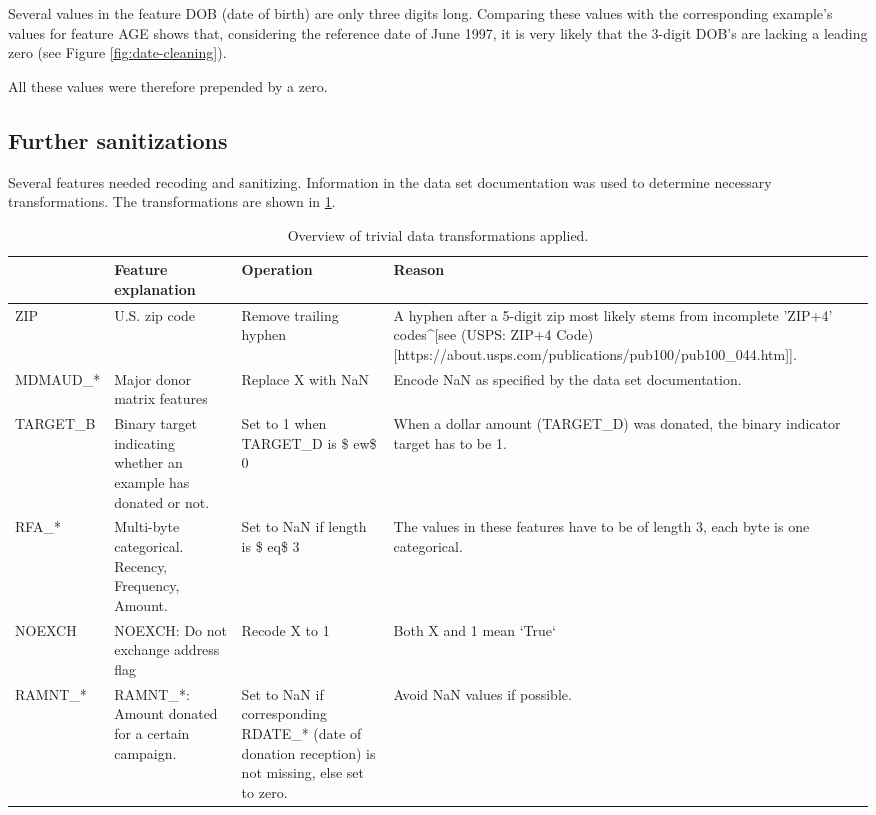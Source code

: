 \documentclass[
  11pt,
  a4paper,
  DIV=12,captions=tableheading,oneside]{scrbook}
\begin{document}
Several values in the feature DOB (date of birth) are only three digits long. Comparing these values with the corresponding example's values for feature AGE shows that, considering the reference date of June 1997, it is very likely that the 3-digit DOB's are lacking a leading zero (see Figure \ref{fig:date-cleaning}).

All these values were therefore prepended by a zero.

\hypertarget{further-sanitizations}{%
\subsection{Further sanitizations}\label{further-sanitizations}}

Several features needed recoding and sanitizing. Information in the data set documentation was used to determine necessary transformations. The transformations are shown in \ref{tab:sanitize}.

\begin{table}[!h]

\caption{\label{tab:sanitize}Overview of trivial data transformations applied.}
\centering
\begin{tabular}{l>{\raggedright\arraybackslash}p{4cm}>{\raggedright\arraybackslash}p{4cm}>{\raggedright\arraybackslash}p{4cm}}
\toprule
  & Feature explanation & Operation & Reason\\
\midrule
ZIP & U.S. zip code & Remove trailing hyphen & A hyphen after a 5-digit zip most likely stems from incomplete 'ZIP+4' codes\textasciicircum{}[see (USPS: ZIP+4 Code)[https://about.usps.com/publications/pub100/pub100\_044.htm]].\\
MDMAUD\_* & Major donor matrix features & Replace X with NaN & Encode NaN as specified by the data set documentation.\\
TARGET\_B & Binary target indicating whether an example has donated or not. & Set to 1 when TARGET\_D is \$
ew\$ 0 & When a dollar amount (TARGET\_D) was donated, the binary indicator target has to be 1.\\
RFA\_* & Multi-byte categorical. Recency, Frequency, Amount. & Set to NaN if length is \$
eq\$ 3 & The values in these features have to be of length 3, each byte is one categorical.\\
NOEXCH & NOEXCH: Do not exchange address flag & Recode X to 1 & Both X and 1 mean `True`\\
\addlinespace
RAMNT\_* & RAMNT\_*: Amount donated for a certain campaign. & Set to NaN if corresponding RDATE\_* (date of donation reception) is not missing, else set to zero. & Avoid NaN values if possible.\\
\bottomrule
\end{tabular}
\end{table}
\end{document}
